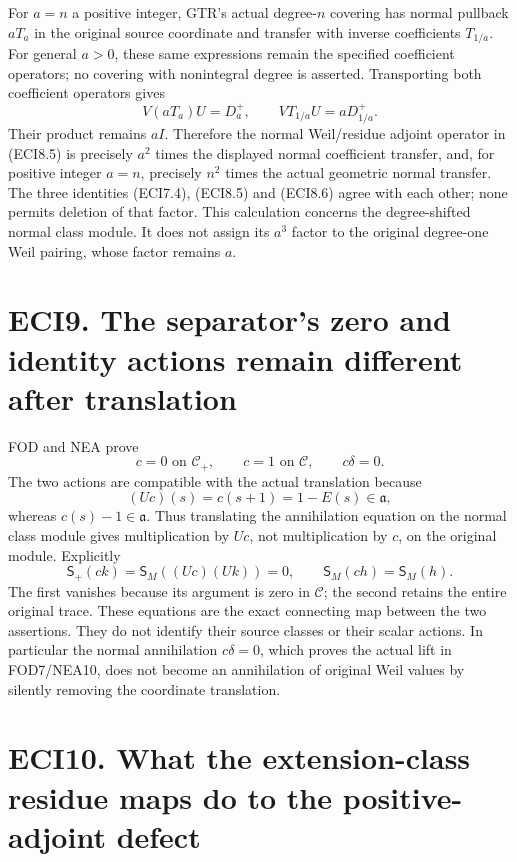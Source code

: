 For \(a=n\) a positive integer, GTR's actual degree-\(n\) covering has
normal pullback \(aT_a\) in the original source coordinate and transfer
with inverse coefficients \(T_{1/a}\). For general \(a>0\), these same
expressions remain the specified coefficient operators; no covering with
nonintegral degree is asserted. Transporting both coefficient operators
gives \[
V(aT_a)U=D_a^+,
\qquad V T_{1/a}U=aD_{1/a}^+.
\tag{ECI8.6}
\] Their product remains \(aI\). Therefore the normal Weil/residue
adjoint operator in (ECI8.5) is precisely \(a^2\) times the displayed
normal coefficient transfer, and, for positive integer \(a=n\),
precisely \(n^2\) times the actual geometric normal transfer. The three
identities (ECI7.4), (ECI8.5) and (ECI8.6) agree with each other; none
permits deletion of that factor. This calculation concerns the
degree-shifted normal class module. It does not assign its \(a^3\)
factor to the original degree-one Weil pairing, whose factor remains
\(a\).

\section{ECI9. The separator's zero and identity actions remain
different after
translation}\label{eci9.-the-separators-zero-and-identity-actions-remain-different-after-translation}

FOD and NEA prove \[
c=0\text{ on }\mathscr C_+,
\qquad c=1\text{ on }\mathscr C,
\qquad c\delta=0.
\tag{ECI9.1}
\] The two actions are compatible with the actual translation because \[
(Uc)(s)=c(s+1)=1-E(s)\in\mathfrak a,
\tag{ECI9.2}
\] whereas \(c(s)-1\in\mathfrak a\). Thus translating the annihilation
equation on the normal class module gives multiplication by \(Uc\), not
multiplication by \(c\), on the original module. Explicitly \[
\mathsf S_+(ck)=\mathsf S_M((Uc)(Uk))=0,
\qquad
\mathsf S_M(ch)=\mathsf S_M(h).
\tag{ECI9.3}
\] The first vanishes because its argument is zero in \(\mathscr C\);
the second retains the entire original trace. These equations are the
exact connecting map between the two assertions. They do not identify
their source classes or their scalar actions. In particular the normal
annihilation \(c\delta=0\), which proves the actual lift in FOD7/NEA10,
does not become an annihilation of original Weil values by silently
removing the coordinate translation.

\section{ECI10. What the extension-class residue maps do to the
positive-adjoint
defect}\label{eci10.-what-the-extension-class-residue-maps-do-to-the-positive-adjoint-defect}

